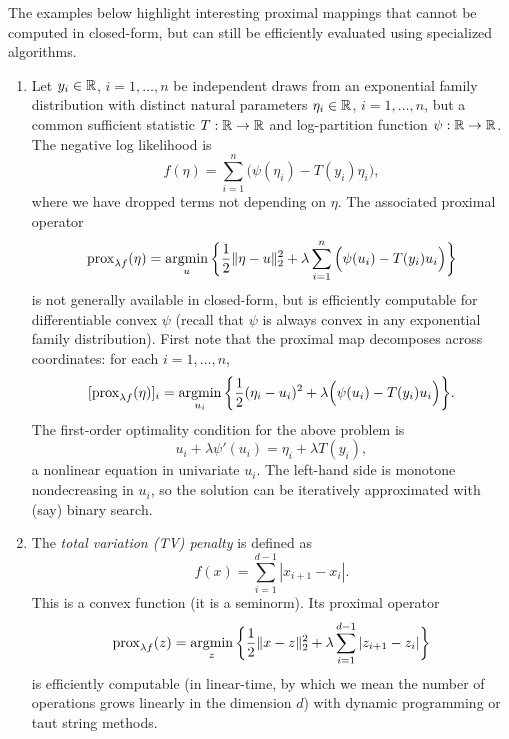 \begin{Example}
\label{xa:proximal_mappings_efficient}
The examples below highlight interesting proximal mappings that cannot be 
computed in closed-form, but can still be efficiently evaluated using
specialized  algorithms.     

\begin{enumerate}[label=\alph*., ref=\alph*]
\item Let $y_i \in \mathbb{R}$, $i = 1,\dots,n$ be independent draws from an
  exponential family distribution with distinct natural parameters $\eta_i \in
  \mathbb{R}$, $i=1,\dots,n$, but a common sufficient statistic $T : \mathbb{R} \to \mathbb{R}$ and
  log-partition function $\psi : \mathbb{R} \to \mathbb{R}$. The negative log likelihood 
  is       
  \[
  f(\eta) = \sum_{i=1}^n \Big( \psi(\eta_i) - T(y_i) \eta_i \Big),
  \]
  where we have dropped terms not depending on $\eta$. The associated proximal
  operator 
  \[
  \operatorname{prox}_{\lambda f}(\eta) = \operatorname*{argmin}_{u} \bigg\{ \frac{1}{2} \|\eta - u\|_2^2 +
  \lambda \sum_{i=1}^n \Big( \psi(u_i) - T(y_i) u_i \Big) \bigg\}
  \]
  is not generally available in closed-form, but is efficiently computable for
  differentiable convex $\psi$ (recall that $\psi$ is always convex in any
  exponential family distribution). First note that the proximal map decomposes
  across coordinates: for each $i=1,\dots,n$,    
  \[
  [\operatorname{prox}_{\lambda f}(\eta)]_i = \operatorname*{argmin}_{u_i} \bigg\{ \frac{1}{2} (\eta_i -
  u_i)^2 + \lambda \Big( \psi(u_i) - T(y_i) u_i \Big) \bigg\}. 
  \]
  The first-order optimality condition for the above problem is 
  \[
  u_i + \lambda \psi'(u_i) = \eta_i + \lambda T(y_i),
  \]
  a nonlinear equation in univariate $u_i$. The left-hand side is monotone
  nondecreasing in $u_i$, so the solution can be iteratively approximated with
  (say) binary search.       

\item {}
  The \emph{total variation (TV) penalty} is defined as
  \begin{equation}
  \label{eq:tv}
  f(x) = \sum_{i=1}^{d-1} |x_{i+1} - x_i|.
  \end{equation}
  This is a convex function (it is a seminorm). Its proximal operator    
  \[
  \operatorname{prox}_{\lambda f}(z) = \operatorname*{argmin}_z \bigg\{ \frac{1}{2} \|x - z\|_2^2 + 
  \lambda \sum_{i=1}^{d-1} |z_{i+1} - z_i| \bigg\}
  \]
  is efficiently computable (in linear-time, by which we mean the number of
  operations grows linearly in the dimension $d$) with dynamic programming or  
  taut string methods.       


\end{enumerate}
\end{Example}
